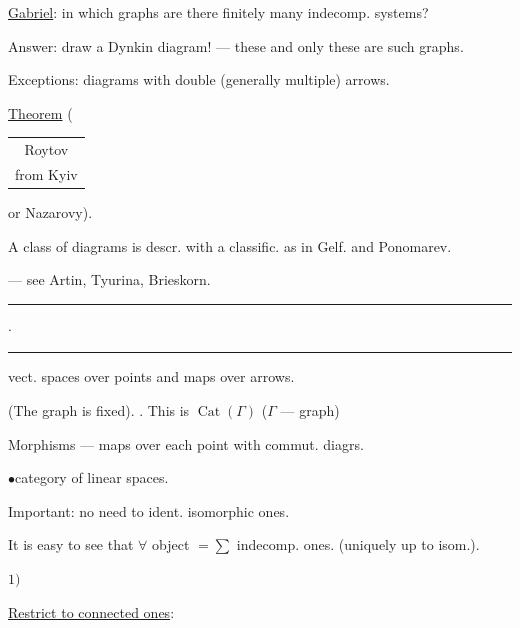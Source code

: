 \underline{Gabriel}: in which graphs are there finitely many indecomp. systems?

Answer: draw a Dynkin diagram! — these and only these are such graphs.

Exceptions: diagrams with double (generally multiple) arrows.



\underline{Theorem}\quad
(\begin{tabular}[t]{@{}c@{}}Roytov\\[-.45ex]\scriptsize from Kyiv\end{tabular}
or Nazarovy).


A class of diagrams is descr. with a classific. as in Gelf. and Ponomarev.

\quad — see Artin, Tyurina, Brieskorn.


\begin{center}
\rule[.5ex]{18mm}{.35pt}\enspace$\cdot$\enspace\rule[.5ex]{25mm}{.35pt}
\end{center}

\quad {} vect. spaces over points and maps over arrows.

(The graph is fixed). \quad {}. This is $\operatorname{Cat}(\Gamma)$
($\Gamma$ — graph)

Morphisms — maps over each point with commut. diagrs.

$\bullet$\qquad category of linear spaces.

Important: no need to ident. isomorphic ones.


It is easy to see that $\forall$ object $=\sum$ indecomp. ones. (uniquely up to isom.).

$1)$\quad {}

\underline{Restrict to connected ones}:



